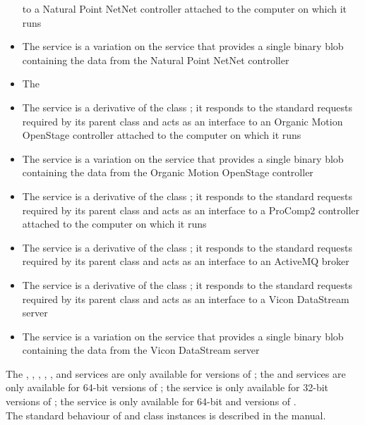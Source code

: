 \begin{itemize}
to a Natural Point NetNet controller attached to the computer on which it runs
\item\exSp{}The \textbf{\NNBI} service is a variation on the \NNI{} service that provides
a single binary blob containing the data from the Natural Point NetNet controller
\item\exSp{}The \textbf{\PDO}
\item\exSp{}The \textbf{\OSI} service is a derivative of the \mplusm{} class
;
it responds to the standard requests required by its parent class and acts as an interface
to an Organic Motion OpenStage controller attached to the computer on which it runs
\item\exSp{}The \textbf{\OSBI} service is a variation on the \OSI{} service that provides
a single binary blob containing the data from the Organic Motion OpenStage controller
\item\exSp{}The \textbf{\PCtwoI} service is a derivative of the \mplusm{} class
;
it responds to the standard requests required by its parent class and acts as an interface
to a ProComp2 controller attached to the computer on which it runs
\item\exSp{}The \textbf{\SMO} service is a derivative of the \mplusm{} class
;
it responds to the standard requests required by its parent class and acts as an interface
to an ActiveMQ broker
\item\exSp{}The \textbf{\VDSI} service is a derivative of the \mplusm{} class
;
it responds to the standard requests required by its parent class and acts as an interface
to a Vicon DataStream server
\item\exSp{}The \textbf{\VBI} service is a variation on the \VDSI{} service that provides
a single binary blob containing the data from the Vicon DataStream server
\end{itemize}

The \KVtwoI, \KVtwoBI, \KVtwoSI, \NNI, \NNBI, \VDSI{} and \VBI{} services are only
available for \win{} versions of \mplusm;
the \OSI{} and \OSBI{} services are only available for \win{} 64-bit versions of \mplusm;
the \PCtwoI{} service is only available for \win{} 32-bit versions of \mplusm;
the \SMO{} service is only available for \win{} 64-bit and \mac{} versions of \mplusm.\\

The standard behaviour of  and 
class instances is described in the \emph{\MMM} manual.
\primaryEnd{}
